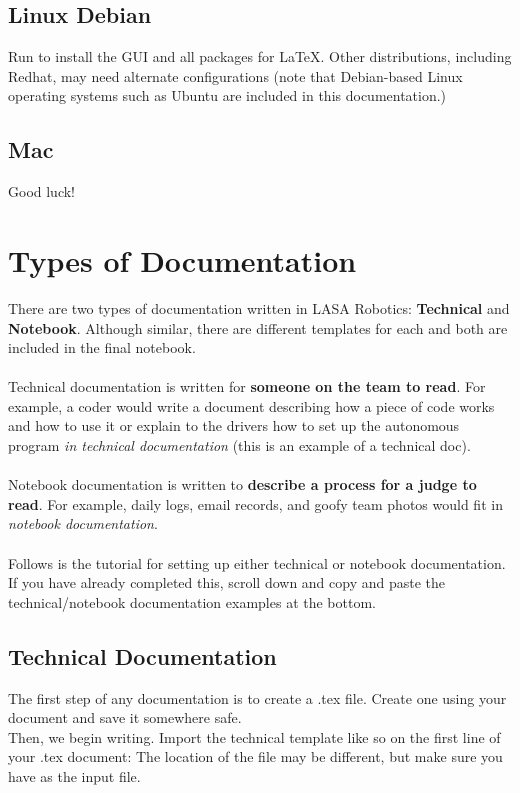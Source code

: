 \subsection{Linux Debian}
Run  to install the GUI and all packages for \LaTeX{}.  Other distributions, including Redhat, may need alternate configurations (note that Debian-based Linux operating systems such as Ubuntu are included in this documentation.)

\subsection{Mac}
Good luck!

\newpage

\section{Types of Documentation}
There are two types of documentation written in LASA Robotics: \textbf{Technical} and \textbf{Notebook}. Although similar, there are different templates for each and both are included in the final notebook.\\\\
Technical documentation is written for \textbf{someone on the team to read}. For example, a coder would write a document describing how a piece of code works and how to use it or explain to the drivers how to set up the autonomous program \emph{in technical documentation} (this is an example of a technical doc).\\\\
Notebook documentation is written to \textbf{describe a process for a judge to read}.  For example, daily logs, email records, and goofy team photos would fit in \emph{notebook documentation}.\\\\
Follows is the tutorial for setting up either technical or notebook documentation.  If you have already completed this, scroll down and copy and paste the technical/notebook documentation examples at the bottom.

\subsection{Technical Documentation}
The first step of any documentation is to create a .tex file.  Create one using your document and save it somewhere safe.\\
Then, we begin writing.  Import the technical template like so on the first line of your .tex document:  The location of the file may be different, but make sure you have  as the input file.

